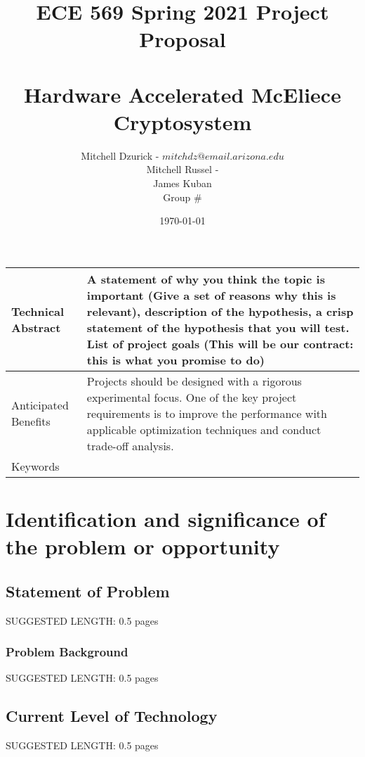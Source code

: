 \documentclass[12pt]{article}
\title {{\bf ECE 569 Spring 2021 Project Proposal} \\
\noindent\makebox[\linewidth]{\rule{\paperwidth}{0.4pt}} \\
\large{Hardware Accelerated McEliece Cryptosystem}
}
\author{Mitchell Dzurick - $mitchdz@email.arizona.edu$ \\ Mitchell Russel - \\ James Kuban \\ Group $\#$ }
\date{\today}
\begin{document}
\maketitle

\tableofcontents
\listoffigures
\listoftables
\clearpage


\begin{center}
    \begin{tabular}{ | m{3.8cm} | m{12cm} | } 
        \hline
        Technical Abstract & A statement of why you think the topic is important (Give a set of reasons why this is relevant),  description of the hypothesis, a crisp statement of the hypothesis that you will test. List of project goals (This will be our contract: this is what you promise to do) \\ 
        \hline
        Anticipated Benefits & Projects should be designed with a rigorous experimental focus. One of the key project requirements is to improve the performance with applicable optimization techniques and conduct trade-off analysis. \\
        \hline
        Keywords &  \\ 
        \hline
    \end{tabular}
\end{center}


\section{Identification and significance of the problem or opportunity} \label{Identification and significance of the problem or opportunity}
    \subsection{Statement of Problem}\label{Statement of Problem}
        \colorbox{BurntOrange}{SUGGESTED LENGTH: 0.5 pages}

    \subsubsection{Problem Background}\label{Problem Background}
        \colorbox{BurntOrange}{SUGGESTED LENGTH: 0.5 pages}
    
    \subsection{Current Level of Technology}\label{Current Level of Technology}
        \colorbox{BurntOrange}{SUGGESTED LENGTH: 0.5 pages}
    
\end{document}
